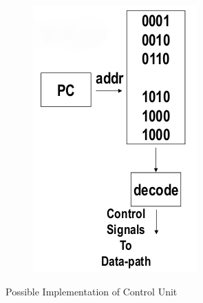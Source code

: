 \begin{figure}[H]
\begin{subfigure}[b]{0.30\textwidth}
		\includegraphics[width=\textwidth]{./Cap5/Images/Image18.png}
		\caption{}
		\label{fig:programCU}
	\end{subfigure}
	\caption{Possible Implementation of Control Unit}
\end{figure}
